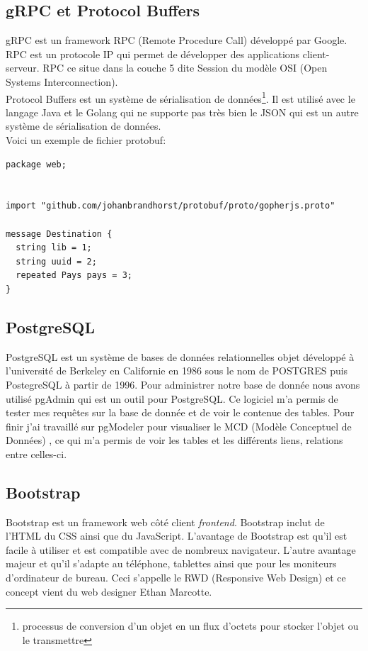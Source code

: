\documentclass[12pt,a4paper]{report}
\begin{document}
\subsection{gRPC et Protocol Buffers}
gRPC est un framework RPC (Remote Procedure Call) développé par Google. RPC est un protocole IP qui permet de développer des applications client-serveur. RPC ce situe dans la couche 5 dite Session du modèle OSI (Open Systems Interconnection).\\

Protocol Buffers est un système de sérialisation de données\footnote{processus de conversion d'un objet en un flux d'octets pour stocker l'objet ou le transmettre}. Il est utilisé  avec le langage Java et le Golang qui ne supporte pas très bien le JSON qui est un autre système de sérialisation de données.\\


\newpage
Voici un exemple de fichier protobuf:
\lstset{style=Golang}
\begin{lstlisting}
package web;


import "github.com/johanbrandhorst/protobuf/proto/gopherjs.proto"

message Destination {
  string lib = 1;
  string uuid = 2;
  repeated Pays pays = 3;
}
\end{lstlisting}
\subsection{PostgreSQL}
PostgreSQL est un système de bases de données relationnelles objet développé à l'université de Berkeley en Californie en 1986 sous le nom de POSTGRES puis PostegreSQL  à partir de 1996. Pour administrer notre base de donnée nous avons  utilisé pgAdmin qui est un outil pour PostgreSQL. Ce logiciel m'a permis de tester mes requêtes sur la base de donnée et de voir le contenue des tables. Pour finir j'ai travaillé sur pgModeler pour visualiser le MCD (Modèle Conceptuel de Données) , ce qui m'a permis de voir les tables et les différents liens, relations entre celles-ci.



\subsection{Bootstrap}
Bootstrap est un framework web côté client \textit{frontend}. Bootstrap inclut de l'HTML du CSS ainsi que du JavaScript. L'avantage de Bootstrap est qu'il est facile à utiliser et est compatible avec de nombreux navigateur. L'autre avantage majeur et qu'il s'adapte au téléphone, tablettes ainsi que pour les moniteurs d'ordinateur de bureau. Ceci s'appelle le RWD (Responsive Web Design) et ce concept vient du web designer Ethan Marcotte.
\end{document}

